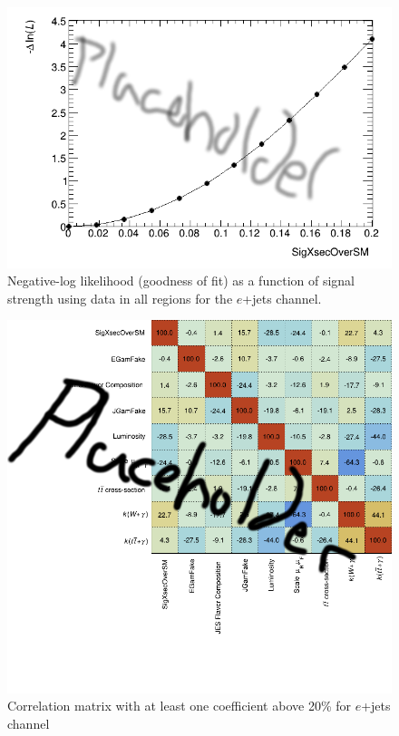 \begin{figure}[h!]
	\centering
	\includegraphics[width=.5\columnwidth]{../ThesisImages/RegionPlots/FinalRegions/FCNC_All_ejets/LHoodPlots/NLLscan_SigXsecOverSM.png}
	\caption{Negative-log likelihood (goodness of fit) as a function of signal strength using data in all regions for the $e$+jets channel.}
	\label{fig:NLLejets}
\end{figure}

\begin{figure}[h!]
	\centering
	\includegraphics[width=.5\columnwidth]{../ThesisImages/RegionPlots/FinalRegions/FCNC_All_ejets/CorrMatrix.png}
	\caption[Correlation matrix  with at least one coefficient above 20\% for $e$+jets channel]{Correlation matrix  with at least one coefficient above 20\% for $e$+jets channel }
	\label{fig:Correjets}
\end{figure}

